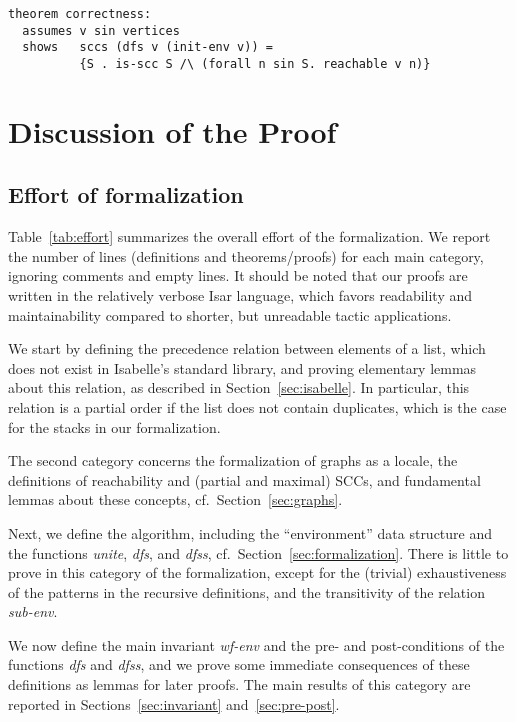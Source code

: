 \documentclass[sigplan,10pt,anonymous,review]{acmart}
\newcommand{\prog}[1]{\textit{#1}}
\begin{document}
\begin{small}
\begin{lstlisting}[language=isabelle]
theorem correctness:
  assumes v sin vertices
  shows   sccs (dfs v (init-env v)) = 
          {S . is-scc S /\ (forall n sin S. reachable v n)}
\end{lstlisting}
\end{small}


\section{Discussion of the Proof}
\label{sec:discussion}

\subsection{Effort of formalization}
\label{sec:effort}

Table~\ref{tab:effort} summarizes the overall effort of the formalization. We report the number of lines (definitions and theorems/proofs) for each main category, ignoring comments and empty lines. It should be noted that our proofs are written in the relatively verbose Isar language, which favors readability and maintainability compared to shorter, but unreadable tactic applications.

We start by defining the precedence relation between elements of a list, which does not exist in Isabelle's standard library, and proving elementary lemmas about this relation, as described in Section~\ref{sec:isabelle}. In particular, this relation is a partial order if the list does not contain duplicates, which is the case for the stacks in our formalization.

The second category concerns the formalization of graphs as a locale, the definitions of reachability and (partial and maximal) SCCs, and fundamental lemmas about these concepts, cf.\ Section~\ref{sec:graphs}.

Next, we define the algorithm, including the ``environment'' data structure and the functions \prog{unite}, \prog{dfs}, and \prog{dfss}, cf.\ Section~\ref{sec:formalization}. There is little to prove in this category of the formalization, except for the (trivial) exhaustiveness of the patterns in the recursive definitions, and the transitivity of the relation \prog{sub-env}.

We now define the main invariant \prog{wf-env} and the pre- and post-conditions of the functions \prog{dfs} and \prog{dfss}, and we prove some immediate consequences of these definitions as lemmas for later proofs. The main results of this category are reported in Sections~\ref{sec:invariant} and~\ref{sec:pre-post}.
\end{document}
